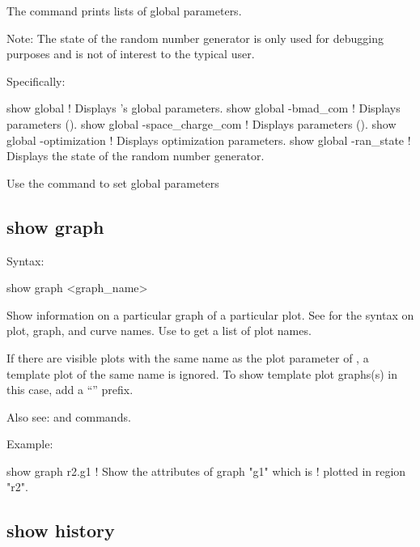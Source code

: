 {{{{{{{{The  command prints lists of global parameters. 

Note: The state of the random number generator is only used for debugging purposes and is not of
interest to the typical user.

Specifically:
\begin{example}
  show global                   ! Displays \tao's global parameters.
  show global -bmad_com         ! Displays  parameters ().
  show global -space_charge_com ! Displays  parameters ().
  show global -optimization     ! Displays optimization parameters.
  show global -ran_state        ! Displays the state of the random number generator.
\end{example}

Use the  command to set global parameters 


\subsection{show graph}
\label{s:show.graph}

Syntax:
\begin{example}
  show graph <graph_name>
\end{example}

Show information on a particular graph of a particular plot. See  for the syntax on
plot, graph, and curve names.  Use  to get a list of plot names.

If there are visible plots with the same name as the plot parameter of , a template plot
of the same name is ignored. To show template plot graphs(s) in this case, add a ``''
prefix.

Also see:  and  commands.

Example:
\begin{example}
  show graph r2.g1         ! Show the attributes of graph "g1" which is 
                           !   plotted in region "r2".
\end{example}


\subsection{show history}
\label{s:show.history}

}}}}}}}}
